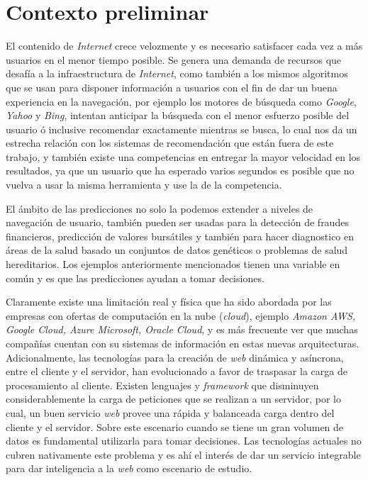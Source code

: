 \section{Contexto preliminar}\label{sec:preliminar}

	
	El contenido de \emph{Internet} crece velozmente y es necesario satisfacer cada vez a más usuarios en el menor tiempo posible. Se genera una demanda de recursos que desafía a la infraestructura de \emph{Internet}, como también a los mismos algoritmos que se usan para disponer información a usuarios con el fin de dar un buena experiencia en la navegación, por ejemplo los motores de búsqueda como \emph{Google}, \emph{Yahoo} y \emph{Bing}, intentan anticipar la búsqueda con el menor esfuerzo posible del usuario ó inclusive recomendar exactamente mientras se busca, lo cual nos da un estrecha relación con los sistemas de recomendación que están fuera de este trabajo, y también existe una competencias en entregar la mayor velocidad en los resultados, ya que un usuario que ha esperado varios segundos es posible que no vuelva a usar la misma herramienta y use la de la competencia.
	
	{El ámbito de las predicciones no solo la podemos extender a niveles de navegación de usuario, también pueden ser usadas para la detección de fraudes financieros, predicción de valores bursátiles y también para hacer diagnostico en áreas de la salud basado un conjuntos de datos genéticos o problemas de salud hereditarios. Los ejemplos anteriormente mencionados tienen una variable en común y es que las predicciones ayudan a tomar decisiones.}\label{ejemplos-casos-contextopreliminar}
	
	 Claramente existe una limitación real y física que ha sido abordada por las empresas con ofertas de computación en la nube (\emph{cloud}), ejemplo \emph{Amazon AWS, Google Cloud, Azure Microsoft, Oracle Cloud}, y es más frecuente ver que muchas compañías cuentan con su sistemas de información en estas nuevas arquitecturas. Adicionalmente, las tecnologías para la creación de \emph{web} dinámica y asíncrona, entre el cliente y el servidor, han evolucionado a favor de traspasar la carga de procesamiento al cliente. Existen lenguajes y \emph{framework} que disminuyen considerablemente la carga de peticiones que se realizan a un servidor, por lo cual, un buen servicio \emph{web} provee una rápida y balanceada carga dentro del cliente y el servidor. Sobre este escenario cuando se tiene un gran volumen de datos es fundamental utilizarla para tomar decisiones. Las tecnologías actuales no cubren nativamente este problema y es ahí el interés de dar un servicio integrable para dar inteligencia a la \emph{web} como escenario de estudio.

